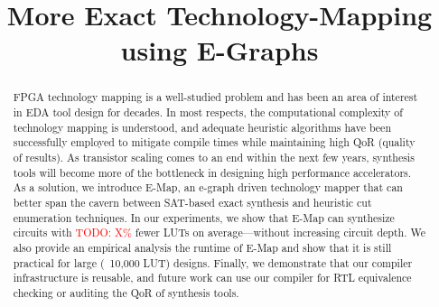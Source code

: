\documentclass[sigplan,nonacm]{acmart}
\newcommand{\todo}[1]{\textcolor{red}{TODO: #1}}
\newcommand{\fullname}{More Exact Technology-Mapping using E-Graphs}
\newcommand{\shortname}{E-Map}
\begin{document}
\title{\fullname}

\begin{abstract}
    FPGA technology mapping is a well-studied problem and has been an area of interest in EDA tool design for decades.
    In most respects, the computational complexity of technology mapping is understood, and adequate heuristic algorithms have been successfully employed to mitigate compile times while maintaining high QoR (quality of results).
    As transistor scaling comes to an end within the next few years, synthesis tools will become more of the bottleneck in designing high performance accelerators. As a solution, we introduce \shortname{}, an e-graph driven technology mapper that can better span the cavern between SAT-based exact synthesis and heuristic cut enumeration techniques.
    In our experiments, we show that \shortname{} can synthesize circuits with \todo{X\%} fewer LUTs on average---without increasing circuit depth.
    We also provide an empirical analysis the runtime of \shortname{} and show that it is still practical for large (~10,000 LUT) designs.
    Finally, we demonstrate that our compiler infrastructure is reusable, and future work can use our compiler for RTL equivalence checking or auditing the QoR of synthesis tools.
\end{abstract}
\maketitle %










\end{document}
